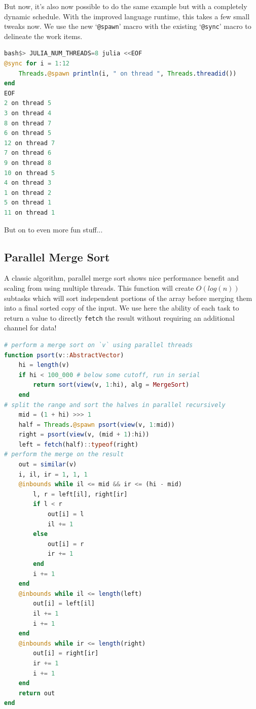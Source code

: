 \documentclass{juliacon}
\begin{document}
But now, it's also now possible to do the same example but with a completely dynamic schedule. With the improved language runtime, this takes a few small tweaks now. We use the new `\verb|@spawn|' macro with the existing `\verb|@sync|' macro to delineate the work items.

\begin{lstlisting}[language = Julia]
bash$> JULIA_NUM_THREADS=8 julia <<EOF
@sync for i = 1:12
    Threads.@spawn println(i, " on thread ", Threads.threadid())
end
EOF
2 on thread 5
3 on thread 4
8 on thread 7
6 on thread 5
12 on thread 7
7 on thread 6
9 on thread 8
10 on thread 5
4 on thread 3
1 on thread 2
5 on thread 1
11 on thread 1
\end{lstlisting}

But on to even more fun stuff...

\subsection{Parallel Merge Sort}
\label{subsub:psort}

A classic algorithm, parallel merge sort shows nice performance benefit and scaling from using multiple threads. This function will create $O(log(n))$ subtasks which will sort independent portions of the array before merging them into a final sorted copy of the input. We use here the ability of each task to return a value to directly \verb|fetch| the result without requiring an additional channel for data!

\begin{lstlisting}[language = Julia]
# perform a merge sort on `v` using parallel threads
function psort(v::AbstractVector)
    hi = length(v)
    if hi < 100_000 # below some cutoff, run in serial
        return sort(view(v, 1:hi), alg = MergeSort)
    end
# split the range and sort the halves in parallel recursively
    mid = (1 + hi) >>> 1
    half = Threads.@spawn psort(view(v, 1:mid))
    right = psort(view(v, (mid + 1):hi))
    left = fetch(half)::typeof(right)
# perform the merge on the result
    out = similar(v)
    i, il, ir = 1, 1, 1
    @inbounds while il <= mid && ir <= (hi - mid)
        l, r = left[il], right[ir]
        if l < r
            out[i] = l
            il += 1
        else
            out[i] = r
            ir += 1
        end
        i += 1
    end
    @inbounds while il <= length(left)
        out[i] = left[il]
        il += 1
        i += 1
    end
    @inbounds while ir <= length(right)
        out[i] = right[ir]
        ir += 1
        i += 1
    end
    return out
end
\end{lstlisting}
\end{document}
